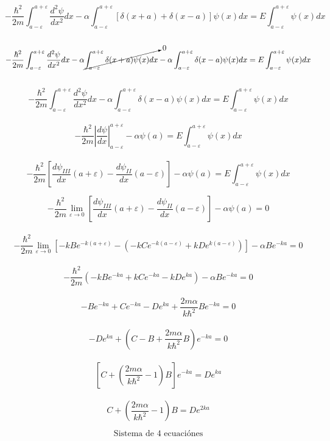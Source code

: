 \documentclass[10pt,a4papper]{article}
\begin{document}
\[-\frac{\hbar^2}{2m}\int_{a-\varepsilon}^{a+\varepsilon}\frac{d^2\psi}{dx^2}dx
-\alpha\int_{a-\varepsilon}^{a+\varepsilon}[\delta(x+a)+\delta(x-a)]\psi(x)dx=
E\int_{a-\varepsilon}^{a+\varepsilon}\psi(x)dx\]\\

\[-\frac{\hbar^2}{2m}\int_{a-\varepsilon}^{a+\varepsilon}\frac{d^2\psi}{dx^2}dx
-\alpha\cancelto{0}{\int_{a-\varepsilon}^{a+\varepsilon}\delta(x+a)\psi(x)dx}
-\alpha\int_{a-\varepsilon}^{a+\varepsilon}\delta(x-a)\psi(x)dx=
E\int_{a-\varepsilon}^{a+\varepsilon}\psi(x)dx\]\\

\[-\frac{\hbar^2}{2m}\int_{a-\varepsilon}^{a+\varepsilon}\frac{d^2\psi}{dx^2}dx
-\alpha\int_{a-\varepsilon}^{a+\varepsilon}\delta(x-a)\psi(x)dx=
E\int_{a-\varepsilon}^{a+\varepsilon}\psi(x)dx\]\\

\[-\frac{\hbar^2}{2m}\left|\frac{d\psi}{dx}\right|_{a-\varepsilon}^{a+\varepsilon}
-\alpha\psi(a)=
E\int_{a-\varepsilon}^{a+\varepsilon}\psi(x)dx\]\\

\[-\frac{\hbar^2}{2m}\left[\frac{d\psi_{III}}{dx}(a+\varepsilon)-\frac{d\psi_{II}}{dx}(a-\varepsilon)\right]
-\alpha\psi(a)=
E\int_{a-\varepsilon}^{a+\varepsilon}\psi(x)dx\]

\newpage
\[-\frac{\hbar^2}{2m}\lim_{\varepsilon\to 0}\left[\frac{d\psi_{III}}{dx}(a+\varepsilon)-\frac{d\psi_{II}}{dx}(a-\varepsilon)\right]
-\alpha\psi(a)=0\]\\


\[-\frac{\hbar^2}{2m}\lim_{\varepsilon\to 0}\left[-kBe^{-k(a+\varepsilon)}-\left(-kCe^{-k(a-\varepsilon)}+kDe^{k(a-\varepsilon)}\right)\right]
-\alpha Be^{-ka}=0\]\\

\[-\frac{\hbar^2}{2m}\left(-kBe^{-ka}+kCe^{-ka}-kDe^{ka}\right)-\alpha Be^{-ka}=0\]\\

\[-Be^{-ka}+Ce^{-ka}-De^{ka}+\frac{2m\alpha}{k\hbar^2}Be^{-ka}=0\]\\

\[-De^{ka}+\left(C-B+\frac{2m\alpha}{k\hbar^2}B\right)e^{-ka}=0\]\\

\[\left[C+\left(\frac{2m\alpha}{k\hbar^2}-1\right)B\right]e^{-ka}=De^{ka}\]\\

\[\boxed{C+\left(\frac{2m\alpha}{k\hbar^2}-1\right)B=De^{2ka}}\]

\newpage
\[\text{Sistema de 4 ecuaciónes}\]
\end{document}
